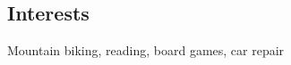 \documentclass[margin,line]{resume}
\begin{document}
\begin{resume}


    \section{\mysidestyle Interests} 
    Mountain biking, reading, board games, car repair

\end{resume}
\end{document}
